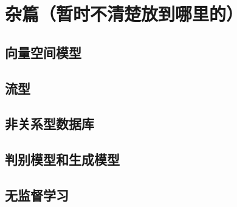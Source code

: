 \chapter{杂篇（暂时不清楚放到哪里的）}
    \section{向量空间模型}
    \section{流型}
    \section{非关系型数据库}
    \section{判别模型和生成模型}
    \section{无监督学习}